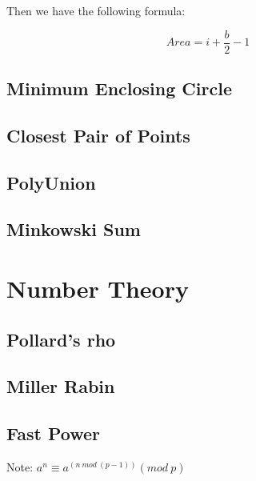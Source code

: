 \documentclass[a4paper,10pt,twocolumn,oneside]{article}
\begin{document}
Then we have the following formula:

$$
Area = i + \frac{b}{2} - 1
$$

\subsection{Minimum Enclosing Circle}


\subsection{Closest Pair of Points}


\subsection{PolyUnion}


% 

\subsection{Minkowski Sum}


\section{Number Theory}

\subsection{Pollard's rho}


\subsection{Miller Rabin}


\subsection{Fast Power}
{ \normalsize
Note: $a^n \equiv a^{(n \ mod \ (p-1))} (mod \ p)$
}
\end{document}
